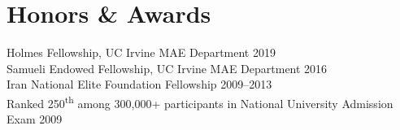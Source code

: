 \documentclass[11pt,letterpaper]{article}
\begin{document}
\section*{Honors \& Awards}

Holmes Fellowship, UC Irvine MAE Department \hfill 2019\\
Samueli Endowed Fellowship, UC Irvine MAE Department \hfill 2016\\
Iran National Elite Foundation Fellowship \hfill 2009--2013\\
Ranked 250\textsuperscript{th} among 300,000+ participants in National University Admission Exam \hfill 2009
\end{document}
